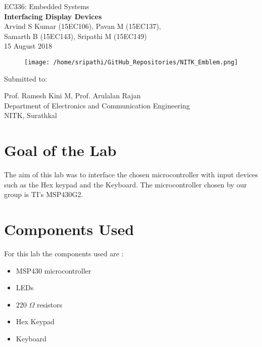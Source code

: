 \documentclass[12pt, letterpaper]{article}
\begin{document}
\begin{titlepage}

\begin{center}
	\large{EC336: Embedded Systems}\\
	\huge{\textbf{Interfacing Display Devices}}\\
	\large{Arvind S Kumar (15EC106), Pavan M (15EC137),\\ Samarth B (15EC143), Sripathi M (15EC149)}\\
	\large{15 August 2018}
\end{center}	

\begin{figure}[!h]
	\centering
	\texttt{[image: /home/sripathi/GitHub\_Repositories/NITK\_Emblem.png]}
	\label{fig:NITKEmblem}
\end{figure}	
\begin{center}
	
\huge{Submitted to:}\\
\begin{large}
Prof. Ramesh Kini M, Prof. Arulalan Rajan\\
Department of Electronics and Communication Engineering\\
NITK, Surathkal
\end{large}

\end{center}

\end{titlepage}

\section{Goal of the Lab}

The aim of this lab was to interface the chosen microcontroller with input devices such as the Hex keypad and the Keyboard. The microcontroller chosen by our group is TI's MSP430G2.

\section{Components Used}

For this lab the components used are :

\begin{itemize}
	\item MSP430 microcontroller
	\item LEDs
	\item 220 $\Omega$ resistors
	\item Hex Keypad
	\item Keyboard
\end{itemize}
\end{document}
